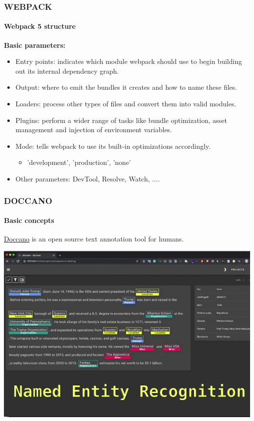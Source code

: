 \documentclass[10pt]{beamer}
\begin{document}
\begin{frame}
    \frametitle{\textbf{WEBPACK}}
    \framesubtitle{\textbf{Webpack 5 structure}}
    \large{\textbf{Basic parameters:}}
    \begin{itemize}
        \item Entry points: indicates which module webpack should use to begin building out its internal dependency graph.
        \item Output: where to emit the bundles it creates and how to name these files.
        \item Loaders: process other types of files and convert them into valid modules.
        \item Plugins: perform a wider range of tasks like bundle optimization, asset management and injection of environment variables.
        \item Mode: tells webpack to use its built-in optimizations accordingly.
        \begin{itemize}
            \item 'development', 'production', 'none'
        \end{itemize} 
        \item Other parameters: DevTool, Resolve, Watch, .... 
    \end{itemize}
\end{frame}
\begin{frame}
    \frametitle{\textbf{DOCCANO}}
    \framesubtitle{\textbf{Basic concepts}}
    \begin{definition}[Doccano]
        \href{https://github.com/doccano/doccano/}{\underline{Doccano}} is an open source text annotation tool for humans.
    \end{definition}
    {\centering\includegraphics[scale=0.28]{doc_NER.png}\par}
\end{frame}
\end{document}
